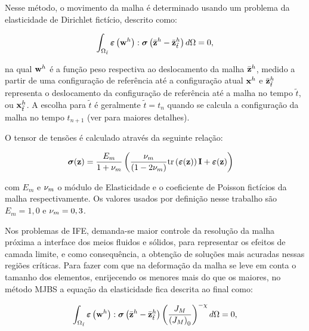 \documentclass[tese_patricia]{subfiles}
\begin{document}
Nesse método, o movimento da malha é determinado usando um problema da elasticidade de Dirichlet fictício, descrito como:

\begin{align}
	\int_{\Omega_{\tilde{t}}} \bm{\varepsilon} \left(\mathbf{w}^h\right) : \boldsymbol{\sigma} \left(\bar{\mathbf{z}}^h - \bar{\mathbf{z}}^h_{\tilde{t}}\right) d\Omega = 0,
	\label{eq:elasticityequation}
\end{align}


\noindent na qual $\mathbf{w}^h$ é a função peso respectiva ao deslocamento da malha  $\bar{\mathbf{z}}^h$, medido a partir de uma configuração de referência até a configuração atual $\mathbf{x}^h$ e 
$\bar{\mathbf{z}}^h_{\tilde{t}}$ representa o deslocamento da configuração de referência até a malha no tempo ${\tilde{t}}$, ou $\mathbf{x}^h_{\tilde{t}}$. 
A escolha para ${\tilde{t}}$ é geralmente ${\tilde{t}} = {t_{n}}$ quando se calcula a configuração da malha no tempo ${t_{n+1}}$ (ver  para maiores detalhes). 

O tensor de tensões é calculado através da seguinte relação:

\begin{align}
	\boldsymbol{\sigma}(\mathbf{z})
	&=
	\frac{E_m}{1+\nu_m}
	\left(
	\frac{\nu_m}{(1 - 2 \nu_m)}
	\mathrm{tr}\left(\bm{\varepsilon}(\mathbf{z})\right)\mathbf{I}
	+
	\bm{\varepsilon}(\mathbf{z})
	\right)
\end{align}

\noindent com $E_m$ e $\nu_m$ o módulo de Elasticidade e o coeficiente de Poisson fictícios da malha respectivamente. Os valores usados por definição nesse trabalho são $E_m=1,0$ e $\nu_m = 0,3$.

Nos problemas de IFE, demanda-se maior controle da resolução da malha próxima a interface dos meios fluidos e sólidos, para representar os efeitos de camada limite, e como consequência, a obtenção de soluções mais acuradas nessas regiões críticas. Para fazer com que na deformação da malha se leve em conta o tamanho dos elementos, enrijecendo os menores mais do que os maiores, no método MJBS a equação da elasticidade fica descrita ao final como:

\begin{align}
	\int_{\Omega_{\tilde{t}}} \bm{\varepsilon} \left(\mathbf{w}^h\right) : \boldsymbol{\sigma} \left(\bar{\mathbf{z}}^h- \bar{\mathbf{z}}^h_{\tilde{t}}\right) \left(\frac{J_M}{\left({J_M}\right)_0}\right)^{-\chi} d\Omega = 0, 
	\label{eq:MJBS}
\end{align}
\end{document}
